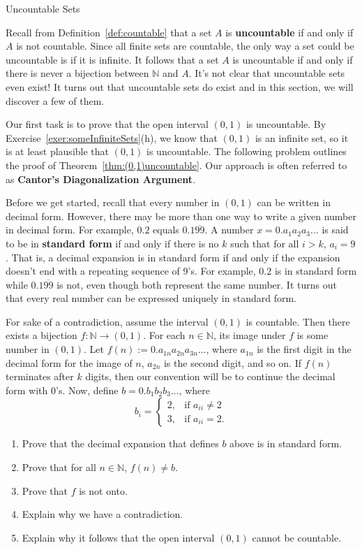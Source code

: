 \begin{section}{Uncountable Sets}

Recall from Definition~\ref{def:countable} that a set $A$ is \textbf{uncountable} if and only if $A$ is not countable.  Since all finite sets are countable, the only way a set could be uncountable is if it is infinite.  It follows that a set $A$ is uncountable if and only if there is never a bijection between $\mathbb{N}$ and $A$.  It's not clear that uncountable sets even exist!  It turns out that uncountable sets do exist and in this section, we will discover a few of them.

Our first task is to prove that the open interval $(0,1)$ is uncountable.  By Exercise~\ref{exer:someInfiniteSets}(h), we know that $(0,1)$ is an infinite set, so it is at least plausible that $(0,1)$ is uncountable.  The following problem outlines the proof of Theorem~\ref{thm:(0,1)uncountable}.  Our approach is often referred to as \textbf{Cantor's Diagonalization Argument}.

Before we get started, recall that every number in $(0,1)$ can be written in decimal form. However, there may be more than one way to write a given number in decimal form.  For example, $0.2$ equals $0.1\overline{99}$.  A number $x=0.a_1a_2a_3\ldots$ is said to be in \textbf{standard form} if and only if there is no $k$ such that for all $i>k$, $a_i=9$. That is, a decimal expansion is in standard form if and only if the expansion doesn't end with a repeating sequence of 9's. For example, $0.2$ is in standard form while $0.1\overline{99}$ is not, even though both represent the same number. It turns out that every real number can be expressed uniquely in standard form.

\begin{problem}
For sake of a contradiction, assume the interval $(0,1)$ is countable.  Then there exists a bijection $f:\mathbb{N}\to (0,1)$. For each $n\in\mathbb{N}$, its image under $f$ is some number in $(0,1)$.  Let $f(n):=0.a_{1n}a_{2n}a_{3n}\ldots$, where $a_{1n}$ is the first digit in the decimal form for the image of $n$, $a_{2n}$ is the second digit, and so on. If $f(n)$ terminates after $k$ digits, then our convention will be to continue the decimal form with 0's. Now, define $b=0.b_1b_2b_3\ldots$, where
\[
b_i=\begin{cases}
2, & \text{if }a_{ii}\neq 2\\
3, & \text{if }a_{ii}=2.
\end{cases}
\]
\begin{enumerate}[label=\textrm{(\alph*)}]
\item Prove that the decimal expansion that defines $b$ above is in standard form.
\item Prove that for all $n\in\mathbb{N}$, $f(n)\neq b$.
\item Prove that $f$ is not onto.
\item Explain why we have a contradiction.
\item Explain why it follows that the open interval $(0,1)$ cannot be countable.
\end{enumerate}
\end{problem}


\end{section}
